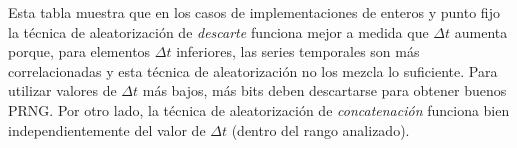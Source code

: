 Esta tabla muestra que en los casos de implementaciones de enteros y punto fijo la técnica de aleatorización de \textit{descarte} funciona mejor a medida que $\Delta t$ aumenta porque, para elementos $\Delta t$ inferiores, las series temporales son más correlacionadas y esta técnica de aleatorización no los mezcla lo suficiente.
Para utilizar valores de $\Delta t$ más bajos, más bits deben descartarse para obtener buenos PRNG.
Por otro lado, la técnica de aleatorización de \textit{concatenación} funciona bien independientemente del valor de $\Delta t$ (dentro del rango analizado).